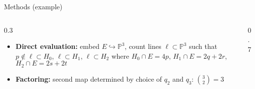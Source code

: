 \documentclass{beamer}
\renewcommand{\P}{\mathbb P}
\theoremstyle{definition}
\begin{document}
                                                                                                                                                                                                                          \begin{frame}{Methods (example)}
      \begin{columns}[c]
        \begin{column}{0.3\hsize}
                                                                                                                                                                                                                            \begin{itemize}
                                                                                                                                                                                                                            \item {\bf Direct evaluation:} embed $E\hookrightarrow\P^3$, count lines $\ell\subset\P^3$
                                                                                                                                                                                                                              such that $p\notin\ell\subset H_0$, $\ell\subset H_1$, $\ell\subset H_2$ where $H_0\cap E=4p$, $H_1\cap E=2q+2r$, $H_2\cap E=2s+2t$
                                                                                                                                                                                                                            \item {\bf Factoring:} second map determined by choice
                                                                                                                                                                                                                              of $q_2$ and $q_3$: $\binom 32=3$
                                                                                                                                                                                                                            \end{itemize}
        \end{column}
        \begin{column}{0.7\hsize}


\end{column}
\end{columns}
\end{frame}
\end{document}
